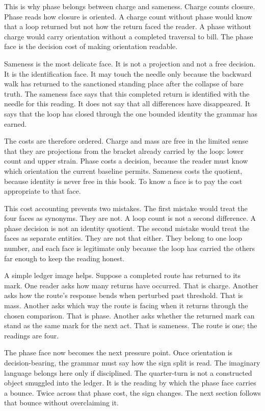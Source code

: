 This is why phase belongs between charge and sameness. Charge counts closure.
Phase reads how closure is oriented. A charge count without phase would know
that a loop returned but not how the return faced the reader. A phase without
charge would carry orientation without a completed traversal to bill. The
phase face is the decision cost of making orientation readable.

Sameness is the most delicate face. It is not a projection and not a free
decision. It is the identification face. It may touch the needle only because
the backward walk has returned to the sanctioned standing place after the
collapse of bare truth. The sameness face says that this completed return is
identified with the needle for this reading. It does not say that all
differences have disappeared. It says that the loop has closed through the
one bounded identity the grammar has earned.

The costs are therefore ordered. Charge and mass are free in the limited
sense that they are projections from the bracket already carried by the loop:
lower count and upper strain. Phase costs a decision, because the reader must
know which orientation the current baseline permits. Sameness costs the
quotient, because identity is never free in this book. To know a face is to
pay the cost appropriate to that face.

This cost accounting prevents two mistakes. The first mistake would treat
the four faces as synonyms. They are not. A loop count is not a second
difference. A phase decision is not an identity quotient. The second mistake
would treat the faces as separate entities. They are not that either. They
belong to one loop number, and each face is legitimate only because the loop
has carried the others far enough to keep the reading honest.

A simple ledger image helps. Suppose a completed route has returned to its
mark. One reader asks how many returns have occurred. That is charge. Another
asks how the route's response bends when perturbed past threshold. That is
mass. Another asks which way the route is facing when it returns through the
chosen comparison. That is phase. Another asks whether the returned mark can
stand as the same mark for the next act. That is sameness. The route is one;
the readings are four.

The phase face now becomes the next pressure point. Once orientation is
decision-bearing, the grammar must say how the sign split is read. The
imaginary language belongs here only if disciplined. The quarter-turn is not
a constructed object smuggled into the ledger. It is the reading by which the
phase face carries a bounce. Twice across that phase cost, the sign changes.
The next section follows that bounce without overclaiming it.
